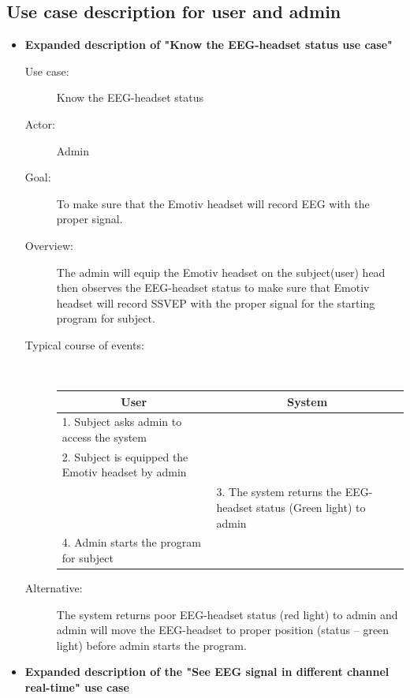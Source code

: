 \subsection{Use case description for user and admin}
\begin{itemize}
	
\item \textbf{Expanded description of "Know the EEG-headset status
use case" }

\begin{description}
	\item [Use case:] Know the EEG-headset status 
	\item [Actor:] Admin 
	\item [Goal:] To make sure that the Emotiv headset will record EEG with
	the proper signal. 
	\item [Overview:] The admin will equip the Emotiv headset on the subject(user)
	head then observes the EEG-headset status to make sure that Emotiv
	headset will record SSVEP with the proper signal for the starting
	program for subject. 
	\item [Typical course of events:]~

	{
		\centering
        
		\begin{tabular}{| m{.47\linewidth} | m{.47\linewidth} |}
			
		\hline 
		\multicolumn{1}{|c}{\textbf{User}} & 
  		\multicolumn{1}{|c|}{\textbf{System}}\\
		\hline 
		1. Subject asks admin to access the system &   \\
		\hline 
		2. Subject is equipped the Emotiv headset by admin  &   \\
		\hline 
		& 3. The system returns the EEG-headset status (Green light) to admin \\
		\hline 
		4. Admin starts the program for subject & \\
		\hline 
		
		\end{tabular} 
	}
	\item[Alternative:] The system returns poor EEG-headset status (red light) to admin and admin will move the EEG-headset to proper position (status – green light) before admin starts the program. 

\end{description}

\newpage
\item \textbf{Expanded description of the "See EEG signal in different channel real-time" use case  }


\end{itemize}
